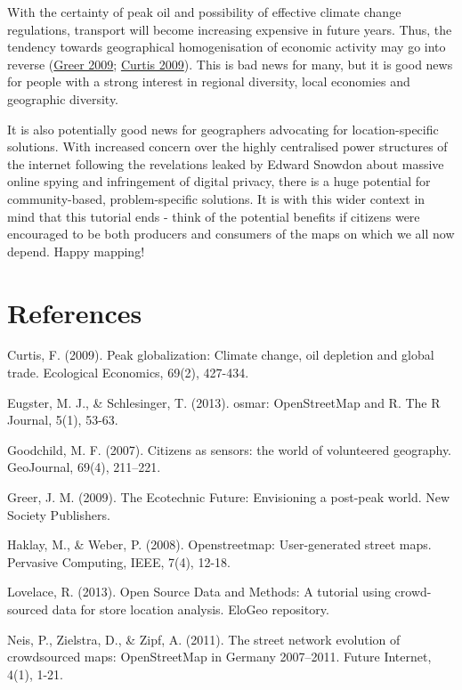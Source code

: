 \documentclass[]{article}
\begin{document}
With the certainty of peak oil and possibility of effective climate
change regulations, transport will become increasing expensive in future
years. Thus, the tendency towards geographical homogenisation of
economic activity may go into reverse
(\href{http://books.google.co.uk/books?hl=en\&lr=\&id=mkV\_knlze0QC\&oi=fnd\&pg=PP2\&dq=ecotechnic+future\&ots=nATRuCVL31\&sig=bwafIZ7kfmZMK1EscQcKyIGeYsU\&redir\_esc=y\#v=onepage\&q=ecotechnic\%20future\&f=false}{Greer
2009};
\href{http://www.sciencedirect.com/science/article/pii/S0921800909003334}{Curtis
2009}). This is bad news for many, but it is good news for people with a
strong interest in regional diversity, local economies and geographic
diversity.

It is also potentially good news for geographers advocating for
location-specific solutions. With increased concern over the highly
centralised power structures of the internet following the revelations
leaked by Edward Snowdon about massive online spying and infringement of
digital privacy, there is a huge potential for community-based,
problem-specific solutions. It is with this wider context in mind that
this tutorial ends - think of the potential benefits if citizens were
encouraged to be both producers and consumers of the maps on which we
all now depend. Happy mapping!

\section{References}

Curtis, F. (2009). Peak globalization: Climate change, oil depletion and
global trade. Ecological Economics, 69(2), 427-434.

Eugster, M. J., \& Schlesinger, T. (2013). osmar: OpenStreetMap and R.
The R Journal, 5(1), 53-63.

Goodchild, M. F. (2007). Citizens as sensors: the world of volunteered
geography. GeoJournal, 69(4), 211--221.

Greer, J. M. (2009). The Ecotechnic Future: Envisioning a post-peak
world. New Society Publishers.

Haklay, M., \& Weber, P. (2008). Openstreetmap: User-generated street
maps. Pervasive Computing, IEEE, 7(4), 12-18.

Lovelace, R. (2013). Open Source Data and Methods: A tutorial using
crowd-sourced data for store location analysis. EloGeo repository.

Neis, P., Zielstra, D., \& Zipf, A. (2011). The street network evolution
of crowdsourced maps: OpenStreetMap in Germany 2007--2011. Future
Internet, 4(1), 1-21.
\end{document}

